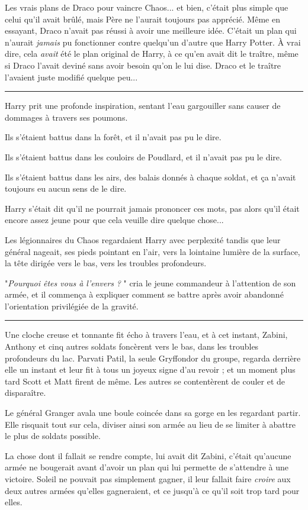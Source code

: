 Les vrais plans de Draco pour vaincre Chaos... et bien, c'était plus simple que celui qu'il avait brûlé, mais Père ne l'aurait toujours pas apprécié. Même en essayant, Draco n'avait pas réussi à avoir une meilleure idée. C'était un plan qui n'aurait \emph{jamais}  pu fonctionner contre quelqu'un d'autre que Harry Potter. À vrai dire, cela \emph{avait}  été le plan original de Harry, à ce qu'en avait dit le traître, même si Draco l'avait deviné sans avoir besoin qu'on le lui dise. Draco et le traître l'avaient juste modifié quelque peu...
\par\noindent\rule{\textwidth}{0.4pt}
Harry prit une profonde inspiration, sentant l'eau gargouiller sans causer de dommages à travers ses poumons.

Ils s'étaient battus dans la forêt, et il n'avait pas pu le dire.

Ils s'étaient battus dans les couloirs de Poudlard, et il n'avait pas pu le dire.

Ils s'étaient battus dans les airs, des balais donnés à chaque soldat, et ça n'avait toujours eu aucun sens de le dire.

Harry s'était dit qu'il ne pourrait jamais prononcer ces mots, pas alors qu'il était encore assez jeune pour que cela veuille dire quelque chose...

Les légionnaires du Chaos regardaient Harry avec perplexité tandis que leur général nageait, ses pieds pointant en l'air, vers la lointaine lumière de la surface, la tête dirigée vers le bas, vers les troubles profondeurs.

"\emph{Pourquoi êtes vous à l'envers}  \emph{?} " cria le jeune commandeur à l'attention de son armée, et il commença à expliquer comment se battre après avoir abandonné l'orientation privilégiée de la gravité.
\par\noindent\rule{\textwidth}{0.4pt}
Une cloche creuse et tonnante fit écho à travers l'eau, et à cet instant, Zabini, Anthony et cinq autres soldats foncèrent vers le bas, dans les troubles profondeurs du lac. Parvati Patil, la seule Gryffondor du groupe, regarda derrière elle un instant et leur fit à tous un joyeux signe d'au revoir ; et un moment plus tard Scott et Matt firent de même. Les autres se contentèrent de couler et de disparaître.

Le général Granger avala une boule coincée dans sa gorge en les regardant partir. Elle risquait tout sur cela, diviser ainsi son armée au lieu de se limiter à abattre le plus de soldats possible.

La chose dont il fallait se rendre compte, lui avait dit Zabini, c'était qu'aucune armée ne bougerait avant d'avoir un plan qui lui permette de s'attendre à une victoire. Soleil ne pouvait pas simplement gagner, il leur fallait faire \emph{croire } aux deux autres armées qu'elles gagneraient, et ce jusqu'à ce qu'il soit trop tard pour elles.

